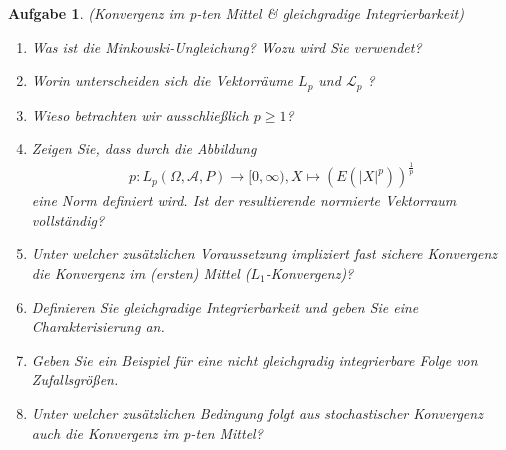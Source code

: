 \documentclass[11pt, a4paper, ngerman]{article}
\newtheorem{aufgabe}{Aufgabe}
\begin{document}
\begin{aufgabe} (Konvergenz im p-ten Mittel \& gleichgradige Integrierbarkeit)
    \begin{enumerate}
        \item 
        Was ist die Minkowski-Ungleichung? Wozu wird Sie verwendet? 
        \item 
        Worin unterscheiden sich die Vektorräume $L_p$ und $\mathcal{L}_p$ ? 
        \item 
        Wieso betrachten wir ausschließlich $p \geq 1$? 
        \item 
        Zeigen Sie, dass durch die Abbildung
        \begin{align*}
            p : L_p(\Omega, \mathcal{A}, P) \to [0,\infty ), X \mapsto (E(\rvert X \lvert^p))^{\frac{1}{p}}
        \end{align*}
        eine Norm definiert wird. Ist der resultierende normierte Vektorraum vollständig? 
        \item 
        Unter welcher zusätzlichen Voraussetzung impliziert fast sichere Konvergenz die Konvergenz im (ersten) Mittel ($L_1$-Konvergenz)? 
        \item 
        Definieren Sie gleichgradige Integrierbarkeit und geben Sie eine Charakterisierung an. 
        \item 
        Geben Sie ein Beispiel für eine nicht gleichgradig integrierbare Folge von Zufallsgrößen. 
        \item 
        Unter welcher zusätzlichen Bedingung folgt aus stochastischer Konvergenz auch die Konvergenz im p-ten Mittel?


    \end{enumerate}
\end{aufgabe}
\end{document}
